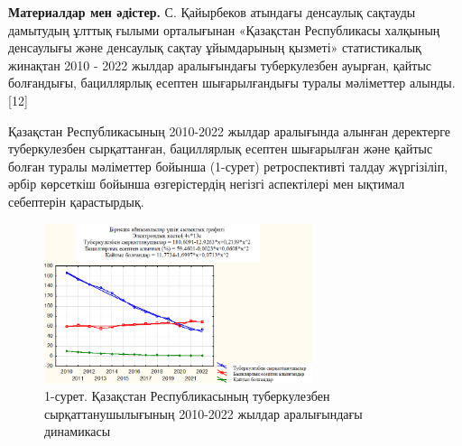\begin{multicols}{2}
{\bfseries Материалдар мен әдістер.} С. Қайырбеков атындағы денсаулық
сақтауды дамытудың ұлттық ғылыми орталығынан «Қазақстан Республикасы
халқының денсаулығы және денсаулық сақтау ұйымдарының қызметі»
статистикалық жинақтан 2010 - 2022 жылдар аралығындағы туберкулезбен
ауырған, қайтыс болғандығы, бациллярлық есептен шығарылғандығы туралы
мәліметтер алынды. {[}12{]}

Қазақстан Республикасының 2010-2022 жылдар аралығында алынған деректерге
туберкулезбен сырқаттанған, бациллярлық есептен шығарылған және қайтыс
болған туралы мәліметтер бойынша (1-сурет) ретроспективті талдау
жүргізіліп, әрбір көрсеткіш бойынша өзгерістердің негізгі аспектілері
мен ықтимал себептерін қарастырдық.

\end{multicols}

\begin{figure}[H]
	\centering
	\includegraphics[width=0.7\textwidth]{assets/168}
	\caption*{1-сурет. Қазақстан Республикасының туберкулезбен
  сырқаттанушылығының 2010-2022 жылдар аралығындағы динамикасы}
\end{figure}


